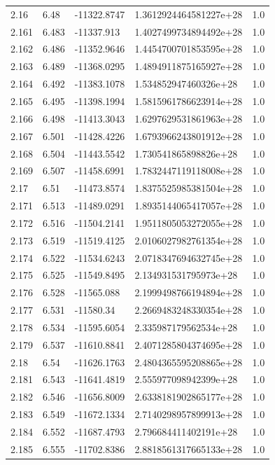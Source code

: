 \begin{tabular}{lllll}
2.16 & 6.48 & -11322.8747 & 1.3612924464581227e+28 & 1.0 \\
2.161 & 6.483 & -11337.913 & 1.4027499734894492e+28 & 1.0 \\
2.162 & 6.486 & -11352.9646 & 1.4454700701853595e+28 & 1.0 \\
2.163 & 6.489 & -11368.0295 & 1.4894911875165927e+28 & 1.0 \\
2.164 & 6.492 & -11383.1078 & 1.534852947460326e+28 & 1.0 \\
2.165 & 6.495 & -11398.1994 & 1.5815961786623914e+28 & 1.0 \\
2.166 & 6.498 & -11413.3043 & 1.6297629531861963e+28 & 1.0 \\
2.167 & 6.501 & -11428.4226 & 1.6793966243801912e+28 & 1.0 \\
2.168 & 6.504 & -11443.5542 & 1.730541865898826e+28 & 1.0 \\
2.169 & 6.507 & -11458.6991 & 1.7832447119118008e+28 & 1.0 \\
2.17 & 6.51 & -11473.8574 & 1.8375525985381504e+28 & 1.0 \\
2.171 & 6.513 & -11489.0291 & 1.8935144065417057e+28 & 1.0 \\
2.172 & 6.516 & -11504.2141 & 1.9511805053272055e+28 & 1.0 \\
2.173 & 6.519 & -11519.4125 & 2.0106027982761354e+28 & 1.0 \\
2.174 & 6.522 & -11534.6243 & 2.0718347694632745e+28 & 1.0 \\
2.175 & 6.525 & -11549.8495 & 2.134931531795973e+28 & 1.0 \\
2.176 & 6.528 & -11565.088 & 2.1999498766194894e+28 & 1.0 \\
2.177 & 6.531 & -11580.34 & 2.2669483248330354e+28 & 1.0 \\
2.178 & 6.534 & -11595.6054 & 2.335987179562534e+28 & 1.0 \\
2.179 & 6.537 & -11610.8841 & 2.4071285804374695e+28 & 1.0 \\
2.18 & 6.54 & -11626.1763 & 2.4804365595208865e+28 & 1.0 \\
2.181 & 6.543 & -11641.4819 & 2.555977098942399e+28 & 1.0 \\
2.182 & 6.546 & -11656.8009 & 2.6338181902865177e+28 & 1.0 \\
2.183 & 6.549 & -11672.1334 & 2.7140298957899913e+28 & 1.0 \\
2.184 & 6.552 & -11687.4793 & 2.796684411402191e+28 & 1.0 \\
2.185 & 6.555 & -11702.8386 & 2.8818561317665133e+28 & 1.0 \\

\end{tabular}
